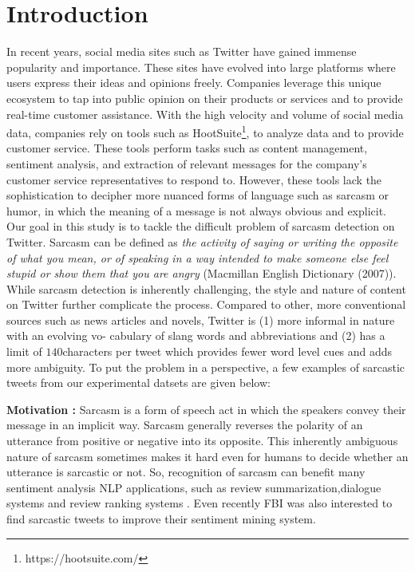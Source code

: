 \section{Introduction}
In recent years, social media sites such as Twitter have gained immense popularity and importance. These sites have
evolved into large platforms where users express their ideas and opinions freely. Companies leverage this unique
ecosystem to tap into public opinion on their products or services and to provide real-time customer assistance. With the high velocity and volume of social media data, companies rely on tools such as HootSuite\footnote{https://hootsuite.com/}, to analyze data and to provide customer service. These tools perform tasks such as content management, sentiment analysis, and extraction of relevant messages for the company's customer service representatives to respond to. However, these tools lack the sophistication to decipher more nuanced forms of language such as sarcasm or humor, in which the meaning of a message is not always obvious and explicit.\\

Our goal in this study is to tackle the difficult problem of sarcasm detection on Twitter. Sarcasm can be defined as  \textit{the activity of saying or writing the opposite of what you mean, or of speaking in a way intended to make someone
else feel stupid or show them that you are angry} (Macmillan English Dictionary (2007)). While sarcasm detection
is inherently challenging, the style and nature of content on Twitter further complicate the process. Compared to other,
more conventional sources such as news articles and novels, Twitter is (1) more informal in nature with an evolving vo-
cabulary of slang words and abbreviations and (2) has a limit of $140 $characters per tweet which provides fewer word level
cues and adds more ambiguity. To put the problem in a perspective, a few examples of sarcastic tweets from our experimental datsets are given below: 

\noindent \textbf{Motivation :} Sarcasm is a form of speech act in which the speakers convey their message in an
implicit way. Sarcasm generally reverses the polarity of an utterance from positive or negative into its opposite. This inherently ambiguous nature of sarcasm sometimes makes it hard even for humans to decide whether an utterance is sarcastic or not. So, recognition of sarcasm can benefit many sentiment analysis NLP applications, such as review summarization,dialogue systems and review ranking systems \cite{Liu_survey}. Even recently FBI was also interested to find sarcastic tweets \cite{fbi_sarcasm} to improve their sentiment mining system.\\

